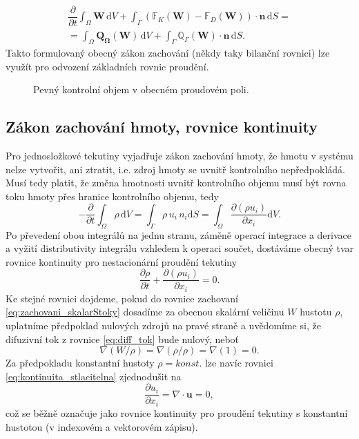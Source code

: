 \begin{multline}\label{eq:zachovani_vektor}
\dfrac{\partial}{\partial t} \int_{\Omega}\mathbf{W} \, \mathrm{d}V + \int_{\Gamma}\left(\mathbb{F}_K(\mathbf{W})-\mathbb{F}_D(\mathbf{W}) \right)\cdot \mathbf{n} \, \mathrm{d}S =\\= \int_{\Omega} \mathbf{Q_\Omega}(\mathbf{W}) \, \mathrm{d}V + \int_{\Gamma} \mathbb{Q}_\Gamma(\mathbf{W}) \cdot \mathbf{n} \, \mathrm{d}S.
\end{multline}
Takto formulovaný obecný zákon zachování (někdy taky bilanční rovnici) lze využít pro odvození základních rovnic proudění.
\begin{figure}
	\def\svgwidth{\columnwidth}
	\graphicspath{{img/inkscape/}}
	
	\caption[Kontrolní objem]{Pevný kontrolní objem v obecném proudovém poli.}
	\label{fig:kontrolni-objem}
\end{figure}

\subsection{Zákon zachování hmoty, rovnice kontinuity}
Pro jednosložkové tekutiny vyjadřuje zákon zachování hmoty, že hmotu v systému nelze vytvořit, ani ztratit, i.e. zdroj hmoty se uvnitř kontrolního nepředpokládá. Musí tedy platit, že změna hmotnosti uvnitř kontrolního objemu musí být rovna toku hmoty přes hranice kontrolního objemu, tedy
\begin{equation}
-\dfrac{\partial}{\partial t}\int_\Omega \rho \,\mathrm{d}V = \int_\Gamma \rho \, u_i \, n_i \mathrm{d}S = \int_\Omega \dfrac{\partial\left(\rho u_i\right)}{\partial x_i}\mathrm{d}V.
\end{equation}
Po převedení obou integrálů na jednu stranu, záměně operací integrace a derivace a vyžití distributivity integrálu vzhledem k operaci součet, dostáváme obecný tvar rovnice kontinuity pro nestacionární proudění tekutiny
\begin{equation}\label{eq:kontinuita_stlacitelna}
\dfrac{\partial \rho}{\partial t} + \dfrac{\partial \left(\rho u_i\right)}{\partial x_i} = 0.
\end{equation}
Ke stejné rovnici dojdeme, pokud do rovnice zachovaní \ref{eq:zachovani_skalarStoky} dosadíme za obecnou skalární veličinu $W$ hustotu $\rho$, uplatníme předpoklad nulových zdrojů na pravé straně a uvědomíme si, že difuzivní tok z rovnice \ref{eq:diff_tok} bude nulový, neboť 
\begin{equation}
\nabla(W/\rho) = \nabla(\rho/\rho) = \nabla(1) = 0.
\end{equation} 
Za předpokladu konstantní hustoty $\rho = konst.$ lze navíc rovnici \ref{eq:kontinuita_stlacitelna} zjednodušit na 
\begin{equation}\label{eq:kontinuita_nestlacitelna}
\dfrac{\partial u_i}{\partial x_i} = \nabla\cdot\mathbf{u} = 0,
\end{equation}
což se běžně označuje jako rovnice kontinuity pro proudění tekutiny s konstantní hustotou (v indexovém a vektorovém zápisu).


